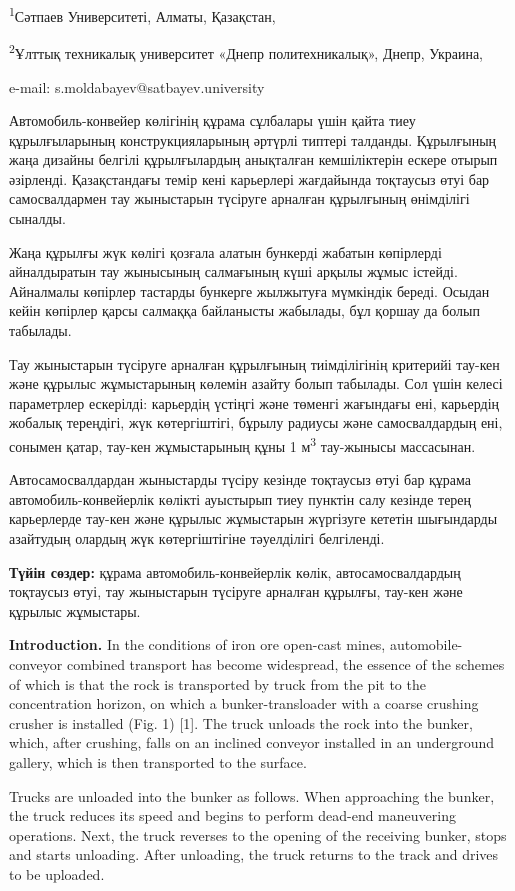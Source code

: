 \textsuperscript{1}Сәтпаев Университеті, Алматы, Қазақстан,

\textsuperscript{2}Ұлттық техникалық университет «Днепр политехникалық»,
Днепр, Украина,

e-mail: s.moldabayev@satbayev.university

Автомобиль-конвейер көлігінің құрама сұлбалары үшін қайта тиеу
құрылғыларының конструкцияларының әртүрлі типтері талданды. Құрылғының
жаңа дизайны белгілі құрылғылардың анықталған кемшіліктерін ескере
отырып әзірленді. Қазақстандағы темір кені карьерлері жағдайында
тоқтаусыз өтуі бар самосвалдармен тау жыныстарын түсіруге арналған
құрылғының өнімділігі сыналды.

Жаңа құрылғы жүк көлігі қозғала алатын бункерді жабатын көпірлерді
айналдыратын тау жынысының салмағының күші арқылы жұмыс істейді.
Айналмалы көпірлер тастарды бункерге жылжытуға мүмкіндік береді. Осыдан
кейін көпірлер қарсы салмаққа байланысты жабылады, бұл қоршау да болып
табылады.

Тау жыныстарын түсіруге арналған құрылғының тиімділігінің критерийі
тау-кен және құрылыс жұмыстарының көлемін азайту болып табылады. Сол
үшін келесі параметрлер ескерілді: карьердің үстіңгі және төменгі
жағындағы ені, карьердің жобалық тереңдігі, жүк көтергіштігі, бұрылу
радиусы және самосвалдардың ені, сонымен қатар, тау-кен жұмыстарының
құны 1 м\textsuperscript{3} тау-жынысы массасынан.

Автосамосвалдардан жыныстарды түсіру кезінде тоқтаусыз өтуі бар құрама
автомобиль-конвейерлік көлікті ауыстырып тиеу пунктін салу кезінде терең
карьерлерде тау-кен және құрылыс жұмыстарын жүргізуге кететін шығындарды
азайтудың олардың жүк көтергіштігіне тәуелділігі белгіленді.

{\bfseries Түйін сөздер:} құрама автомобиль-конвейерлік көлік,
автосамосвалдардың тоқтаусыз өтуі, тау жыныстарын түсіруге арналған
құрылғы, тау-кен және құрылыс жұмыстары.

{\bfseries Introduction.} In the conditions of iron ore open-cast mines,
automobile-conveyor combined transport has become widespread, the
essence of the schemes of which is that the rock is transported by truck
from the pit to the concentration horizon, on which a bunker-transloader
with a coarse crushing crusher is installed (Fig. 1) {[}1{]}. The truck
unloads the rock into the bunker, which, after crushing, falls on an
inclined conveyor installed in an underground gallery, which is then
transported to the surface.

Trucks are unloaded into the bunker as follows. When approaching the
bunker, the truck reduces its speed and begins to perform dead-end
maneuvering operations. Next, the truck reverses to the opening of the
receiving bunker, stops and starts unloading. After unloading, the truck
returns to the track and drives to be uploaded.

